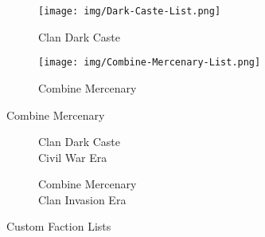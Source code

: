 {
\begin{figure}[!h]
  \begin{center}
  \begin{subfigure}{0.4\textwidth}
    \centering
    \texttt{[image: img/Dark-Caste-List.png]}
    \caption*{Clan Dark Caste}
  \end{subfigure}
  \hspace{1in}
  \begin{subfigure}{0.4\textwidth}
    \centering
    \texttt{[image: img/Combine-Mercenary-List.png]}
    \caption*{Combine Mercenary}
  \end{subfigure}
  \end{center}
\end{figure}
}
{
\begin{figure}[!h]
  \begin{center}
  \begin{subfigure}{0.4\textwidth}
    \centering
    \caption*{Clan Dark Caste\\Civil War Era}
  \end{subfigure}
  \hspace{1in}
  \begin{subfigure}{0.4\textwidth}
    \centering
    \caption*{Combine Mercenary\\Clan Invasion Era}
  \end{subfigure}
  \caption*{Custom Faction Lists}
  \end{center}
\end{figure}
}
